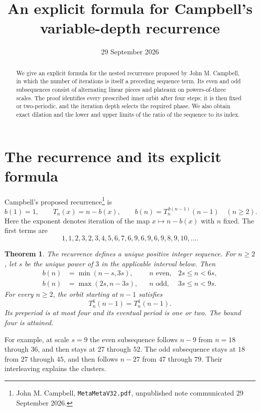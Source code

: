 \documentclass[10pt,a4paper]{article}
\title{An explicit formula for Campbell's\texorpdfstring{\\}{ }variable-depth recurrence}
\author{}
\date{29 September 2026}
\newtheorem{theorem}{Theorem}
\begin{document}
\maketitle
\begin{abstract}
We give an explicit formula for the nested recurrence proposed by John M.
Campbell, in which the number of iterations is itself a preceding sequence
term. Its even and odd subsequences consist of alternating linear pieces and
plateaux on powers-of-three scales. The proof identifies every prescribed
inner orbit after four steps: it is then fixed or two-periodic, and the
iteration depth selects the required phase. We also obtain exact dilation
and the lower and upper limits of the ratio of the sequence to its index.
\end{abstract}

\section{The recurrence and its explicit formula}
Campbell's proposed recurrence\footnote{John M. Campbell,
\texttt{MetaMetaV32.pdf}, unpublished note communicated 29 September 2026.} is
\begin{equation}\label{eq:recurrence}
b(1)=1,\qquad T_n(x)=n-b(x),\qquad
b(n)=T_n^{\,b(n-1)}(n-1)\quad(n\ge2).
\end{equation}
Here the exponent denotes iteration of the map $x\mapsto n-b(x)$ with $n$
fixed. The first terms are
\[
1,1,2,3,2,3,4,5,6,7,6,9,6,9,6,9,8,9,10,\ldots.
\]
\begin{theorem}\label{thm:main}
The recurrence defines a unique positive integer sequence. For $n\ge2$,
let $s$ be the unique power of $3$ in the applicable interval below. Then
\begin{equation}\label{eq:formula}
\begin{aligned}
b(n)&=\min(n-s,3s),&& n\text{ even},&2s\le n<6s,\\
b(n)&=\max(2s,n-3s),&& n\text{ odd},&3s\le n<9s.
\end{aligned}
\end{equation}
For every $n\ge2$, the orbit starting at $n-1$ satisfies
\begin{equation}\label{eq:orbit}
T_n^6(n-1)=T_n^4(n-1).
\end{equation}
Its preperiod is at most four and its eventual period is one or two.
The bound four is attained.
\end{theorem}

For example, at scale $s=9$ the even subsequence follows $n-9$ from
$n=18$ through $36$, and then stays at $27$ through $52$. The odd
subsequence stays at $18$ from $27$ through $45$, and then follows $n-27$
from $47$ through $79$. Their interleaving explains the clusters.
\end{document}

